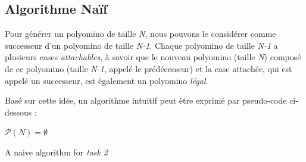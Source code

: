 \documentclass[a4paper,12pt]{article}
\begin{document}
	\subsection{Algorithme Naïf}
	\par Pour générer un polyomino de taille \textit{N}, nous pouvons le considérer comme successeur d'un polyomino de taille \textit{N-1}. Chaque polyomino de taille \textit{N-1} a plusieurs cases \textit{attachables}, à savoir que le nouveau polyomino (taille \textit{N}) composé de ce polyomino (taille \textit{N-1}, appelé le prédécesseur) et la case attachée, qui est appelé un successeur, est également un polyomino \textit{légal}.
	\par Basé sur cette idée, un algorithme intuitif peut être exprimé par pseudo-code ci-dessous :
	\begin{algorithm}
		$\mathcal{P}(N) = \emptyset$\;
		\caption{A naive algorithm for \textit{task 2}}
		\label{algo:fixed count}
	\end{algorithm}
\end{document}

